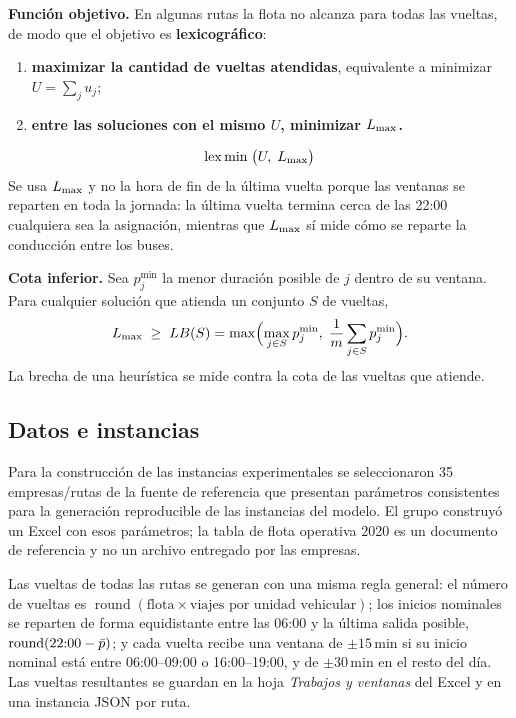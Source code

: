 \textbf{Función objetivo.} En algunas rutas la flota no alcanza para todas las vueltas, de modo que el objetivo es \textbf{lexicográfico}:
\begin{enumerate}
  \item \textbf{maximizar la cantidad de vueltas atendidas}, equivalente a minimizar $U = \sum_j u_j$;
  \item \textbf{entre las soluciones con el mismo $U$, minimizar $L_{\max}$.}
\end{enumerate}
\begin{equation}
  \operatorname{lex\,min}\; \bigl( U,\; L_{\max} \bigr)
\end{equation}
Se usa $L_{\max}$ y no la hora de fin de la última vuelta porque las ventanas se reparten en toda la jornada: la última vuelta termina cerca de las 22:00 cualquiera sea la asignación, mientras que $L_{\max}$ sí mide cómo se reparte la conducción entre los buses.

\textbf{Cota inferior.} Sea $p^{\min}_j$ la menor duración posible de $j$ dentro de su ventana. Para cualquier solución que atienda un conjunto $S$ de vueltas,
\begin{equation}
  L_{\max} \;\ge\; LB(S) = \max\Bigl( \max_{j \in S} p^{\min}_j,\; \frac{1}{m}\sum_{j \in S} p^{\min}_j \Bigr).
\end{equation}
La brecha de una heurística se mide contra la cota de las vueltas que atiende.

\subsection{Datos e instancias}\label{sec:datos}
Para la construcción de las instancias experimentales se seleccionaron 35 empresas/rutas de la fuente de referencia que presentan parámetros consistentes para la generación reproducible de las instancias del modelo. El grupo construyó un Excel con esos parámetros; la tabla de flota operativa 2020 es un documento de referencia y no un archivo entregado por las empresas.

Las vueltas de todas las rutas se generan con una misma regla general: el número de vueltas es $\operatorname{round}(\text{flota} \times \text{viajes por unidad vehicular})$; los inicios nominales se reparten de forma equidistante entre las 06:00 y la última salida posible, $\operatorname{round}(22{:}00 - \bar{p})$; y cada vuelta recibe una ventana de $\pm15$\,min si su inicio nominal está entre 06:00--09:00 o 16:00--19:00, y de $\pm30$\,min en el resto del día. Las vueltas resultantes se guardan en la hoja \emph{Trabajos y ventanas} del Excel y en una instancia JSON por ruta.


